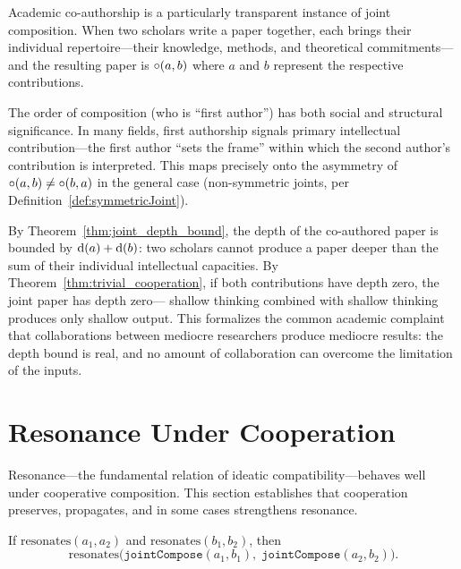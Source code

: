 \begin{example}
\label{ex:coauthorship}
Academic co-authorship is a particularly transparent instance of joint
composition.  When two scholars write a paper together, each brings
their individual repertoire---their knowledge, methods, and
theoretical commitments---and the resulting paper is $\circ(a, b)$
where $a$ and $b$ represent the respective contributions.

The order of composition (who is ``first author'') has both social and
structural significance.  In many fields, first authorship signals
primary intellectual contribution---the first author ``sets the frame''
within which the second author's contribution is interpreted.  This
maps precisely onto the asymmetry of $\circ(a, b) \neq \circ(b,
a)$ in the general case (non-symmetric joints, per
Definition~\ref{def:symmetricJoint}).

By Theorem~\ref{thm:joint_depth_bound}, the depth of the co-authored
paper is bounded by $\operatorname{d}(a) + \operatorname{d}(b)$: two scholars cannot
produce a paper deeper than the sum of their individual intellectual
capacities.  By Theorem~\ref{thm:trivial_cooperation}, if both
contributions have depth zero, the joint paper has depth zero---
shallow thinking combined with shallow thinking produces only shallow
output.  This formalizes the common academic complaint that
collaborations between mediocre researchers produce mediocre results:
the depth bound is real, and no amount of collaboration can overcome
the limitation of the inputs.
\end{example}

\section{Resonance Under Cooperation}
\label{sec:ch16-resonance}

Resonance---the fundamental relation of ideatic compatibility---behaves
well under cooperative composition.  This section establishes that
cooperation preserves, propagates, and in some cases strengthens resonance.

\begin{theorem}
\label{thm:resonant_partners_resonant_output}
If $\text{resonates}(a_1, a_2)$ and $\text{resonates}(b_1, b_2)$, then
\[
  \text{resonates}\bigl(\texttt{jointCompose}(a_1, b_1),\;
  \texttt{jointCompose}(a_2, b_2)\bigr).
\]
\end{theorem}

